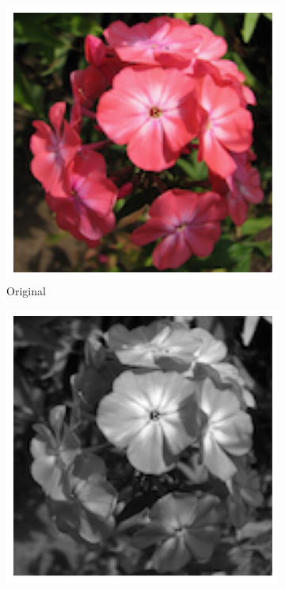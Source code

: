 \documentclass{article}
\begin{document}




\begin{figure}
  \centering
	\begin{subfigure}[b]{0.24\textwidth}
		\includegraphics[width= \textwidth]{path0}
		\caption{Original}
		\label{fg:path0}
	\end{subfigure}
	\begin{subfigure}[b]{0.24\textwidth}
		\includegraphics[width= \textwidth]{imgGrau}

\end{subfigure}
\end{figure}
\end{document}
